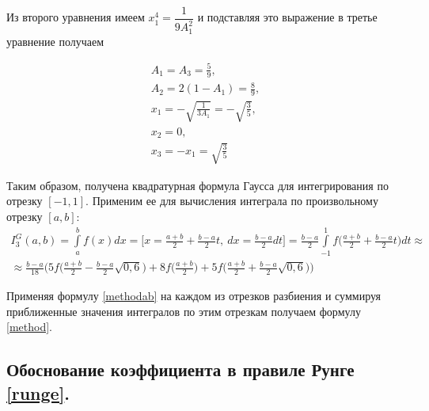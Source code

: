 \documentclass[a4paper, 12pt]{article}
\begin{document}
	Из второго уравнения имеем $x_1^4=\dfrac{1}{9A_1^2}$ и подставляя это выражение в третье уравнение получаем
	
	\begin{equation}
		\begin{gathered}
			A_1=A_3=\frac{5}{9},\\
			A_2=2(1-A_1)=\frac{8}{9},\\
			x_1=-\sqrt{\frac{1}{3A_1}}=-\sqrt{\frac{3}{5}},\\
			x_2=0,\\
			x_3=-x_1=\sqrt{\frac{3}{5}}
		\end{gathered}
	\end{equation}

	Таким образом, получена квадратурная формула Гаусса для интегрирования по отрезку $[-1,1]$. Применим ее для вычисления интеграла по произвольному отрезку $[a,b]$:
	\begin{equation} \label{methodab}
		\begin{gathered}
			I^G_3(a,b)=\int\limits_a^bf(x)dx=\bigg[x=\frac{a+b}{2}+\frac{b-a}{2}t,\ dx=\frac{b-a}{2}dt\bigg]=\frac{b-a}{2}\int\limits_{-1}^1f\bigg(\frac{a+b}{2}+\frac{b-a}{2}t\bigg)dt\approx\\\approx
			\frac{b-a}{18}\bigg(5f\bigg(\frac{a+b}{2}-\frac{b-a}{2}\sqrt{0,6}\bigg)+8f\bigg(\frac{a+b}{2}\bigg)+5f\bigg(\frac{a+b}{2}+\frac{b-a}{2}\sqrt{0,6}\bigg)\bigg)
		\end{gathered}
	\end{equation}

	Применяя формулу \eqref{methodab} на каждом из отрезков разбиения и суммируя приближенные значения интегралов по этим отрезкам получаем формулу \eqref{method}.
	
	\subsection{Обоснование коэффициента в правиле Рунге \eqref{runge}.} \label{rungeproof}
	
\end{document}
